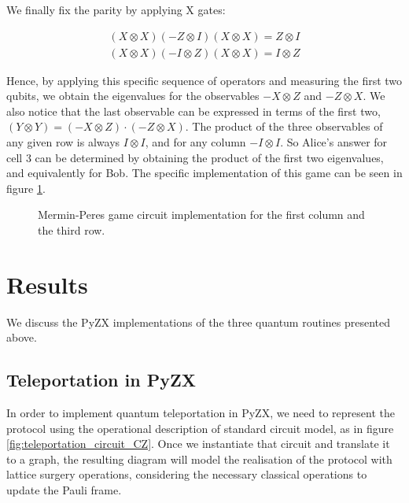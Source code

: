 \documentclass[12pt, twoside, openany]{book}
\begin{document}
We finally fix the parity by applying X gates:

\begin{align*}
    (X \otimes X)(-Z \otimes I)(X \otimes X) = Z \otimes I \\
    (X \otimes X)(-I \otimes Z)(X \otimes X) = I \otimes Z
\end{align*}

Hence, by applying this specific sequence of operators and measuring the first two qubits, we obtain the eigenvalues for the observables $-X \otimes Z$ and $-Z \otimes X$. We also notice that the last observable can be expressed in terms of the first two, $(Y \otimes Y) = (-X \otimes Z) \cdot (-Z \otimes X)$. The product of the three observables of any given row is always $I \otimes I$, and for any column $-I \otimes I$. So Alice's answer for cell 3 can be determined by obtaining the product of the first two eigenvalues, and equivalently for Bob. The specific implementation of this game can be seen in figure \ref{fig:mermin_peres_circuit}.

\begin{figure}[ht]
    \centering
    
    \caption{Mermin-Peres game circuit implementation for the first column and the third row.}
    \label{fig:mermin_peres_circuit}
\end{figure}

\chapter{Results}

We discuss the PyZX implementations of the three quantum routines presented above.

\section{Teleportation in PyZX}

In order to implement quantum teleportation in PyZX, we need to represent the protocol using the operational description of standard circuit model, as in figure \ref{fig:teleportation_circuit_CZ}. Once we instantiate that circuit and translate it to a graph, the resulting diagram will model the realisation of the protocol with lattice surgery operations, considering the necessary classical operations to update the Pauli frame. 
\end{document}
